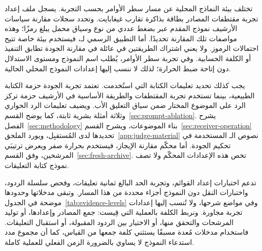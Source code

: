 تختلف بيئة النماذج المحلية عن مسار سطر الأوامر بحسب التجربة. يسجل ملف إعداد تجربة مقتطفات المصادر بطاقة  بذاكرة تقارب  غيغابايت. وتحدد سجلات مقارنة سياسات الأرشيف نموذج  المقدم عبر  بضغط عددي من نوع  وسياق محمل يبلغ  رمزًا؛ وهذه مواصفات تلك المقارنة تحديدًا. أما التطبيق الرسمي لـ، فيستخدم بيئة خاصة تتيح احتمالات الرموز. ولا يعني اشتراك الطريقتين في عائلة  في مقارنة الجودة تطابق التنفيذ أو الكلفة الحسابية. وفي تجربة سطر الأوامر، يُطلب اسم النموذج ومستوى الاستدلال دون إتاحة ضبط الحرارة؛ لذلك لا ننسب إليها إعدادات النموذج المحلي الحالية.

يجب كذلك تحديد تعليمات الكتابة التي استُخدمت. تعتمد تجربة الجودة حزمة  الكتابة الطبيعية، بينما تستخدم تجربة المقتطفات والطريقة الأساسية في الأرشيف حزمة تركز الرد على الموضوع المختار ضمن سياق التعليق الأب. ويضيف  تعليمات الرد الحواري وثلاثة أمثلة بشرية ثابتة، كما يوضح القسم~\ref{sec:prompt-ablation}. يشرح الفصل~\ref{sec:methodology} بناء الموضوعات، ويشرح القسم~\ref{sec:receiver-operation} تحديدها لدى المُستقبِل، ويورد الملحق~\ref{app:judge-material} نصوص الـ المستخدمة في تحكيم الجودة. أما محكّم مقارنة الإيجاز، فيستخدم  بحرارة صفر ويعرض ترتيبَي المرشحين، وفق القسم~\ref{sec:fresh-archive}. تخص هذه الإعدادات المحكّم ولا تصف نموذج كتابة التعليقات.

تدعم اختبارات إعداد القوائم، وتجربة الحد البالغ ثمانية تعليقات، وفحص سلسلة الردود، واختبارات النقل دون النموذج أجزاء محددة من هذا المسار. وتبقى مدخلاتها وحدودها موضحة في الجدول~\ref{tab:evidence-levels} وفي مواضع شرحها، ولا تُنسب إليها إعدادات تجربة مجاورة. ونربط الكلفة بالعملية التي قِيست: جمع المصادر وإعدادها، أو توليد المرشحات والتحقق منها، أو الاختيار بين الردود المقبولة، أو استقبال التعليقات. فاستخدام مدخلات مُعدة مسبقًا يستثني كلفة جمعها من القياس، كما أن مجموع مدد استدعاء النموذج لا يساوي بالضرورة الزمن الفعلي للعملية كاملة.
